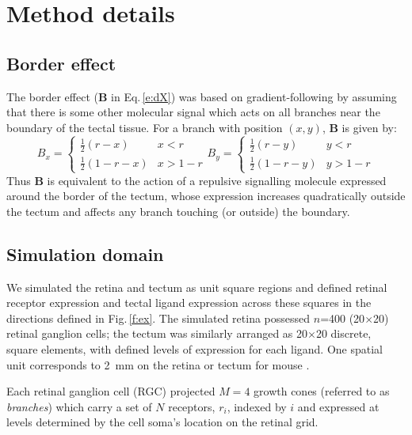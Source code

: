 \documentclass[9pt,lineno,draft]{elife}
\begin{document}
\section{Method details}

\subsection*{Border effect} %
The border effect ($\mathbf{B}$ in Eq.\,\ref{e:dX}) was based on gradient-following by assuming that there is some other molecular signal which acts on all branches near the boundary of the tectal tissue. For a branch with position $(x,y)$, $\mathbf{B}$ is given by:
%
\begin{equation}\label{e:B}
B_x = \begin{cases}
        \frac{1}{2} (r-x)     & x<r \\
        \frac{1}{2} (1-r-x)    & x>1-r
\end{cases}
B_y = \begin{cases}
        \frac{1}{2} (r-y)      & y<r \\
        \frac{1}{2} (1-r-y)    & y>1-r
\end{cases}
\end{equation}
%
Thus $\mathbf{B}$ is equivalent to the action of a repulsive signalling molecule expressed around the border of the tectum, whose expression increases quadratically outside the tectum and affects any branch touching (or outside) the boundary.

\subsection*{Simulation domain}
We simulated the retina and tectum as unit square regions and defined retinal receptor expression and tectal ligand expression across these squares in the directions defined in Fig.\,\ref{f:ex}.
The simulated retina possessed $n$=400 (20$\times$20) retinal ganglion cells; the tectum was similarly arranged as 20$\times$20 discrete, square elements, with defined levels of expression for each ligand.
One spatial unit corresponds to 2~mm on the retina or tectum for mouse \citep{reber_relative_2004}.

Each retinal ganglion cell (RGC) projected $M=4$ growth cones (referred to as \emph{branches}) which carry a set of $N$ receptors, $r_i$, indexed by $i$ and expressed at levels determined by the cell soma's location on the retinal grid.
\end{document}
